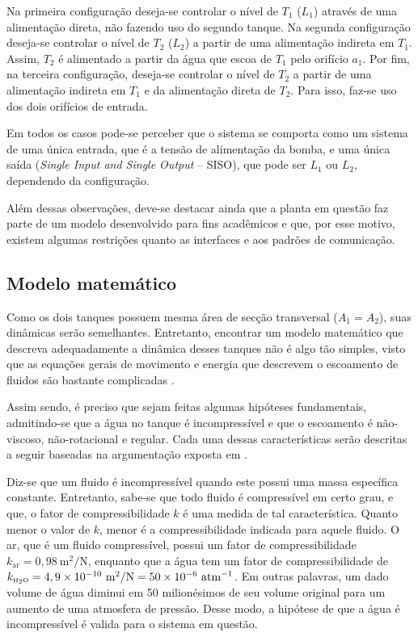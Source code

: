 Na primeira configuração deseja-se controlar o nível de $T_1$ ($L_1$) através de
uma alimentação direta, não fazendo uso do segundo tanque. Na segunda
configuração deseja-se controlar o nível de $T_2$ ($L_2$) a partir de uma
alimentação indireta em $T_1$. Assim, $T_2$ é alimentado a partir da água que
escoa de $T_1$ pelo orifício $a_1$. Por fim, na terceira configuração, deseja-se
controlar o nível de $T_2$ a partir de uma alimentação indireta em $T_1$ e da
alimentação direta de $T_2$. Para isso, faz-se uso dos dois orifícios de
entrada.


Em todos os casos pode-se perceber que o sistema se comporta como um sistema de
uma única entrada, que é a tensão de alimentação da bomba, e uma única saída
({\it Single Input and Single Output} -- SISO), que pode ser $L_1$ ou $L_2$,
dependendo da configuração.


Além dessas observações, deve-se destacar ainda que a planta em questão faz
parte de um modelo desenvolvido para fins acadêmicos e que, por esse motivo,
existem algumas restrições quanto as interfaces e aos padrões de comunicação.

\subsection{Modelo matemático}

Como os dois tanques possuem mesma área de secção transversal ($A_1 = A_2$),
suas dinâmicas serão semelhantes. Entretanto, encontrar um modelo matemático que
descreva adequadamente a dinâmica desses tanques não é algo tão simples, visto
que as equações gerais de movimento e energia que descrevem o escoamento de
fluidos são bastante complicadas \cite{dorf:2009}.

Assim sendo, é preciso que sejam feitas algumas hipóteses fundamentais,
admitindo-se que a água no tanque é incompressível e que o escoamento é
não-viscoso, não-rotacional e regular. Cada uma dessas características serão
descritas a seguir baseadas na argumentação exposta em .

Diz-se que um fluido é incompressível quando este possui uma massa específica
constante. Entretanto, sabe-se que todo fluido é compressível em certo grau, e
que, o fator de compressibilidade $k$ é uma medida de tal característica.
Quanto menor o valor de $k$, menor é a compressibilidade indicada para aquele
fluido. O ar, que é um fluido compressível, possui um fator de compressibilidade
$k_{\text{ar}} = 0,98\ \text{m}^2/\text{N}$, enquanto que a água tem um fator de
compressibilidade de $k_{\tiny \text{\tiny H}_2\text{\tiny O}} = 4,9 \times
10^{-10}\ \text{m}^2/\text{N} = 50 \times 10^{-6}\ \text{atm}^{-1}$. Em outras
palavras, um dado volume de água diminui em 50 milionésimos de seu volume
original para um aumento de uma atmosfera de pressão. Desse modo, a hipótese de
que a água é incompressível é valida para o sistema em questão.

